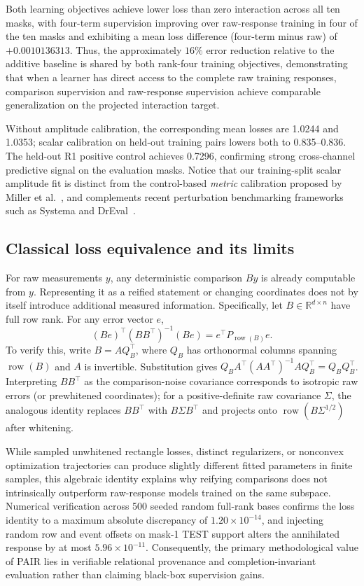 \documentclass[11pt]{article}
\begin{document}
Both learning objectives achieve lower loss than zero interaction across all ten masks, with four-term supervision improving over raw-response training in four of the ten masks and exhibiting a mean loss difference (four-term minus raw) of $+0.0010136313$. Thus, the approximately $16\%$ error reduction relative to the additive baseline is shared by both rank-four training objectives, demonstrating that when a learner has direct access to the complete raw training responses, comparison supervision and raw-response supervision achieve comparable generalization on the projected interaction target.

Without amplitude calibration, the corresponding mean losses are 1.0244 and 1.0353; scalar calibration on held-out training pairs lowers both to 0.835--0.836. The held-out R1 positive control achieves 0.7296, confirming strong cross-channel predictive signal on the evaluation masks. Notice that our training-split scalar amplitude fit is distinct from the control-based \emph{metric} calibration proposed by Miller et al.~\cite{miller2026calibrated}, and complements recent perturbation benchmarking frameworks such as Systema and DrEval~\cite{vinas2026systema,bernett2026dreval}.

\subsection{Classical loss equivalence and its limits}
For raw measurements $y$, any deterministic comparison $By$ is already computable from $y$. Representing it as a reified statement or changing coordinates does not by itself introduce additional measured information. Specifically, let $B\in\mathbb R^{d\times n}$ have full row rank. For any error vector $e$,
\[
 (Be)^\top(BB^\top)^{-1}(Be)
   =e^\top P_{\operatorname{row}(B)}e.
\]
To verify this, write $B=AQ_B^\top$, where $Q_B$ has orthonormal columns spanning $\operatorname{row}(B)$ and $A$ is invertible. Substitution gives $Q_BA^\top(AA^\top)^{-1}AQ_B^\top=Q_BQ_B^\top$. Interpreting $BB^\top$ as the comparison-noise covariance corresponds to isotropic raw errors (or prewhitened coordinates); for a positive-definite raw covariance $\Sigma$, the analogous identity replaces $BB^\top$ with $B\Sigma B^\top$ and projects onto $\operatorname{row}(B\Sigma^{1/2})$ after whitening.

While sampled unwhitened rectangle losses, distinct regularizers, or nonconvex optimization trajectories can produce slightly different fitted parameters in finite samples, this algebraic identity explains why reifying comparisons does not intrinsically outperform raw-response models trained on the same subspace. Numerical verification across 500 seeded random full-rank bases confirms the loss identity to a maximum absolute discrepancy of $1.20\times10^{-14}$, and injecting random row and event offsets on mask-1 TEST support alters the annihilated response by at most $5.96\times10^{-11}$. Consequently, the primary methodological value of PAIR lies in verifiable relational provenance and completion-invariant evaluation rather than claiming black-box supervision gains.
\end{document}
